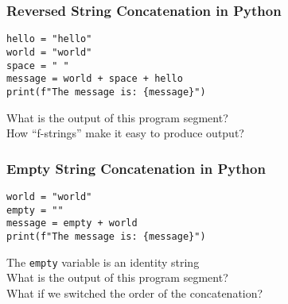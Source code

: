\documentclass[14pt,aspectratio=169]{beamer}
\begin{document}
%
\begin{frame}[fragile]
  \frametitle{Reversed String Concatenation in Python}
  \begin{minipage}{6in}
    \vspace*{.25in}
    \begin{verbatim}
hello = "hello"
world = "world"
space = " "
message = world + space + hello
print(f"The message is: {message}")
    \end{verbatim}
  \end{minipage}
  \vspace*{.05in}
  \begin{center}
    \normalsize \noindent What is the output of this program segment? \\
    \normalsize \noindent How ``f-strings'' make it easy to produce output? \\
  \end{center}
\end{frame}

%
\begin{frame}[fragile]
  \frametitle{Empty String Concatenation in Python}
  \begin{minipage}{6in}
    \vspace*{.25in}
    \begin{verbatim}
world = "world"
empty = ""
message = empty + world
print(f"The message is: {message}")
    \end{verbatim}
  \end{minipage}
  \vspace*{.05in}
  \begin{center}
    \normalsize \noindent The {\tt empty} variable is an identity string \\
    \normalsize \noindent What is the output of this program segment? \\
    \normalsize \noindent What if we switched the order of the concatenation? \\
  \end{center}
\end{frame}
\end{document}
